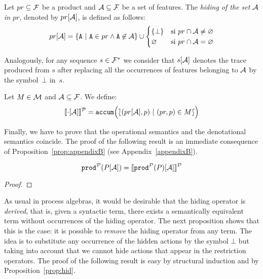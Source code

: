 \bdfn
  Let $pr\subseteq{\cal F}$ be a product and ${\cal A}\subseteq{\cal F}$
  be a set of features. The \emph{hiding of the set ${\cal A}$
    in $pr$}, denoted by $pr[{\cal A}]$, is defined as follows:
  \begin{displaymath}
    pr\hide{\calA} = \{\fA\ |\ \fA\in pr\wedge
    \fA\not\in\calA\}\cup
    \begin{cases}
      \{\bot\} & \mbox{si } pr\cap\calA\neq\emptyset\\
      \emptyset & \mbox{si } pr\cap\calA=\emptyset\\
    \end{cases}
  \end{displaymath}
  
  Analogously, for any sequence $s\in{\cal F}^{*}$ we consider that $s[{\cal A}]$ denotes the
  trace produced from $s$ after replacing all the occurrences of features belonging to ${\cal A}$ by the symbol~$\bot$ in~$s$.
\edfn

\bdfn
  Let $M\in{\cal M}$ and ${\cal A}\subseteq{\cal F}$. We define:
  \begin{displaymath}
    [\![\cdot[{\cal A}]]\!]^{\cal P} = \mathtt{accum}\Bigl(\lbag(pr[{\cal A}],p)\
    |\ (pr,p)\in M\rbag \Bigr)
  \end{displaymath}
\edfn

Finally, we have to prove that the
operational semantics and the denotational semantics coincide. 
%
The proof of the following result is an immediate consequence of Proposition~\ref{prop:appendixB} (see Appendix~\ref{appendixB}).

\bprop\label{prop:hid}
  \begin{displaymath}
    \mathtt{prod}^{\cal P}(P[{\cal A}])  = [\![\mathtt{prod}^{\cal P}(P)[{\cal A}]]\!]^{\cal P}
  \end{displaymath}
  \begin{proof}
  \end{proof}
\eprop

As usual in process algebras, it would be desirable that the hiding operator is \emph{derived}, that is, given a syntactic term, there exists a semantically equivalent term without occurrences of the hiding operator.
The next proposition shows that this is the case: it is possible to \emph{remove} the hiding
operator from any term. The idea is to substitute any occurrence of
the hidden actions by the symbol $\bot$ but taking into account  that we cannot
hide actions that appear in the restriction operators. The proof of the following result is easy by structural induction and by Proposition~\ref{prop:hid}.

